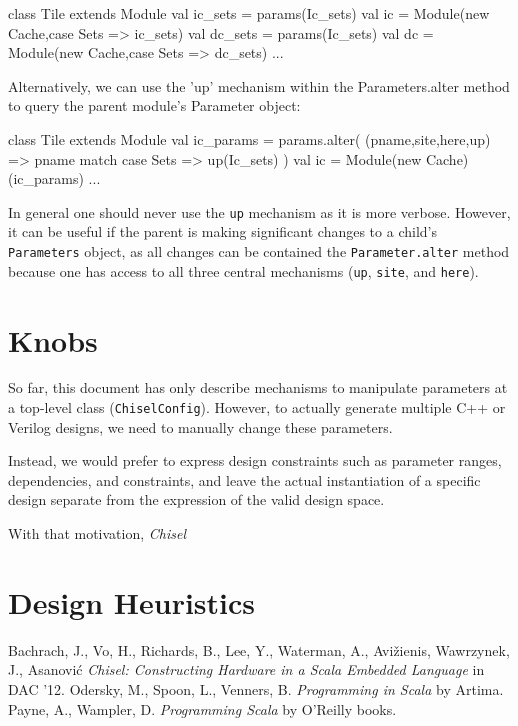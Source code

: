 \documentclass[10pt,twocolumn]{article}
\def\code#1{{\small\tt #1}}
\begin{document}
\begin{scala}
class Tile extends Module {
  val ic_sets = params(Ic_sets)
  val ic = Module(new Cache,{case Sets => ic_sets})
  val dc_sets = params(Ic_sets)
  val dc = Module(new Cache,{case Sets => dc_sets})
    ...
}
\end{scala}
Alternatively, we can use the 'up' mechanism within the Parameters.alter method to query the parent module's Parameter object:
\begin{scala}
class Tile extends Module {
  val ic_params = params.alter(
    (pname,site,here,up) => pname match {
      case Sets => up(Ic_sets)
    }
  )
  val ic = Module(new Cache)(ic_params)
  ...
}
\end{scala}
In general one should never use the \code{up} mechanism as it is more verbose. However, it can be useful if the parent is making significant changes to a child's \code{Parameters} object, as all changes can be contained the \code{Parameter.alter} method because one has access to all three central mechanisms (\code{up}, \code{site}, and \code{here}).

\section{Knobs}
\label{sec:knobs}

So far, this document has only describe mechanisms to manipulate parameters at a top-level class (\code{ChiselConfig}). However, to actually generate multiple C++ or Verilog designs, we need to manually change these parameters.

Instead, we would prefer to express design constraints such as parameter ranges, dependencies, and constraints, and leave the actual instantiation of a specific design separate from the expression of the valid design space.

With that motivation, {\em Chisel}

\section{Design Heuristics}
\label{sec:heuristics}


% 
\begin{thebibliography}{50}
 Bachrach, J., Vo, H., Richards, B., Lee, Y., Waterman,
  A., Avi\v{z}ienis, Wawrzynek, J., Asanovi\'{c} \textsl{Chisel:
    Constructing Hardware in a Scala Embedded Language}
in DAC '12.
Odersky, M., Spoon, L., Venners,
  B. \textsl{Programming in Scala} by Artima.
Payne, A., Wampler, D.
  \textsl{Programming Scala} by O'Reilly books.
\end{thebibliography}
 
\end{document}
